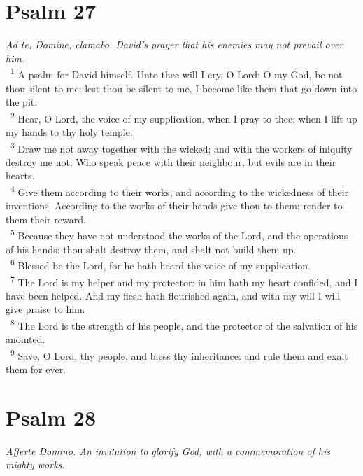 \documentclass[a5paper,12pt]{article}
\begin{document}
\begin{multicols*}{2}
\section{Psalm 27}
\label{sec:org79a3b9c}
\emph{Ad te, Domine, clamabo. David's prayer that his enemies may not prevail over him.}\\

~\textsuperscript{1} A psalm for David himself. Unto thee will I cry, O Lord: O my God, be not thou silent to me: lest thou be silent to me, I become like them that go down into the pit.\\
~\textsuperscript{2} Hear, O Lord, the voice of my supplication, when I pray to thee; when I lift up my hands to thy holy temple.\\
~\textsuperscript{3} Draw me not away together with the wicked; and with the workers of iniquity destroy me not: Who speak peace with their neighbour, but evils are in their hearts.\\
~\textsuperscript{4} Give them according to their works, and according to the wickedness of their inventions. According to the works of their hands give thou to them: render to them their reward.\\
~\textsuperscript{5} Because they have not understood the works of the Lord, and the operations of his hands: thou shalt destroy them, and shalt not build them up.\\
~\textsuperscript{6} Blessed be the Lord, for he hath heard the voice of my supplication.\\
~\textsuperscript{7} The Lord is my helper and my protector: in him hath my heart confided, and I have been helped. And my flesh hath flourished again, and with my will I will give praise to him.\\
~\textsuperscript{8} The Lord is the strength of his people, and the protector of the salvation of his anointed.\\
~\textsuperscript{9} Save, O Lord, thy people, and bless thy inheritance: and rule them and exalt them for ever.\\

\section{Psalm 28}
\label{sec:org2b9ba57}
\emph{Afferte Domino. An invitation to glorify God, with a commemoration of his mighty works.}\\


\end{multicols*}
\end{document}
